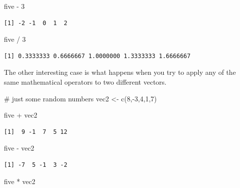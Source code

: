\documentclass[
  letterpaper,
  DIV=11,
  numbers=noendperiod]{scrreprt}
\newenvironment{Shaded}{\begin{snugshade}}{\end{snugshade}}
\newcommand{\CommentTok}[1]{\textcolor[rgb]{0.37,0.37,0.37}{#1}}
\newcommand{\DecValTok}[1]{\textcolor[rgb]{0.68,0.00,0.00}{#1}}
\newcommand{\FunctionTok}[1]{\textcolor[rgb]{0.28,0.35,0.67}{#1}}
\newcommand{\NormalTok}[1]{\textcolor[rgb]{0.00,0.23,0.31}{#1}}
\newcommand{\OtherTok}[1]{\textcolor[rgb]{0.00,0.23,0.31}{#1}}
\newcommand{\SpecialCharTok}[1]{\textcolor[rgb]{0.37,0.37,0.37}{#1}}
\begin{document}
\begin{Shaded}
\begin{Highlighting}[]
\NormalTok{five }\SpecialCharTok{{-}} \DecValTok{3}
\end{Highlighting}
\end{Shaded}

\begin{verbatim}
[1] -2 -1  0  1  2
\end{verbatim}

\begin{Shaded}
\begin{Highlighting}[]
\NormalTok{five }\SpecialCharTok{/} \DecValTok{3}
\end{Highlighting}
\end{Shaded}

\begin{verbatim}
[1] 0.3333333 0.6666667 1.0000000 1.3333333 1.6666667
\end{verbatim}

The other interesting case is what happens when you try to apply any of
the same mathematical operators to two different vectors.

\begin{Shaded}
\begin{Highlighting}[]
\CommentTok{\# just some random numbers}
\NormalTok{vec2 }\OtherTok{\textless{}{-}} \FunctionTok{c}\NormalTok{(}\DecValTok{8}\NormalTok{,}\SpecialCharTok{{-}}\DecValTok{3}\NormalTok{,}\DecValTok{4}\NormalTok{,}\DecValTok{1}\NormalTok{,}\DecValTok{7}\NormalTok{)}

\NormalTok{five }\SpecialCharTok{+}\NormalTok{ vec2}
\end{Highlighting}
\end{Shaded}

\begin{verbatim}
[1]  9 -1  7  5 12
\end{verbatim}

\begin{Shaded}
\begin{Highlighting}[]
\NormalTok{five }\SpecialCharTok{{-}}\NormalTok{ vec2}
\end{Highlighting}
\end{Shaded}

\begin{verbatim}
[1] -7  5 -1  3 -2
\end{verbatim}

\begin{Shaded}
\begin{Highlighting}[]
\NormalTok{five }\SpecialCharTok{*}\NormalTok{ vec2}
\end{Highlighting}
\end{Shaded}
\end{document}
